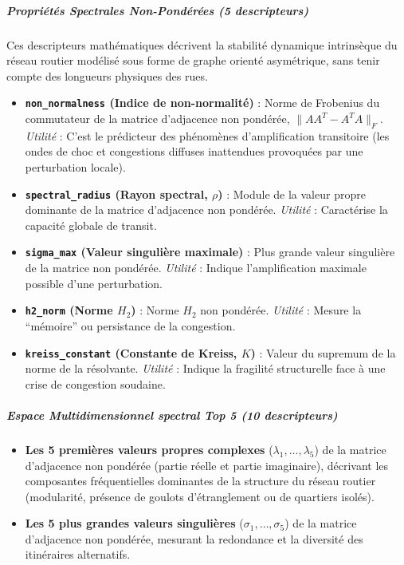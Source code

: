 \documentclass[10pt, a4paper]{article}
\providecommand{\tightlist}{}
\begin{document}
\subparagraph{Propriétés Spectrales Non-Pondérées (5
descripteurs)}\label{propriuxe9tuxe9s-spectrales-non-ponduxe9ruxe9es-5-descripteurs}

Ces descripteurs mathématiques décrivent la stabilité dynamique
intrinsèque du réseau routier modélisé sous forme de graphe orienté
asymétrique, sans tenir compte des longueurs physiques des rues.

\begin{itemize}
\tightlist
\item
  \textbf{\texttt{non\_normalness} (Indice de non-normalité)} : Norme de
  Frobenius du commutateur de la matrice d'adjacence non pondérée,
  \(\|AA^T - A^TA\|_F\). \emph{Utilité} : C'est le prédicteur des
  phénomènes d'amplification transitoire (les ondes de choc et
  congestions diffuses inattendues provoquées par une perturbation
  locale).
\item
  \textbf{\texttt{spectral\_radius} (Rayon spectral, \(\rho\))} : Module
  de la valeur propre dominante de la matrice d'adjacence non pondérée.
  \emph{Utilité} : Caractérise la capacité globale de transit.
\item
  \textbf{\texttt{sigma\_max} (Valeur singulière maximale)} : Plus
  grande valeur singulière de la matrice non pondérée. \emph{Utilité} :
  Indique l'amplification maximale possible d'une perturbation.
\item
  \textbf{\texttt{h2\_norm} (Norme \(H_2\))} : Norme \(H_2\) non
  pondérée. \emph{Utilité} : Mesure la ``mémoire'' ou persistance de la
  congestion.
\item
  \textbf{\texttt{kreiss\_constant} (Constante de Kreiss, \(K\))} :
  Valeur du supremum de la norme de la résolvante. \emph{Utilité} :
  Indique la fragilité structurelle face à une crise de congestion
  soudaine.
\end{itemize}

\subparagraph{Espace Multidimensionnel spectral Top 5 (10
descripteurs)}\label{espace-multidimensionnel-spectral-top-5-10-descripteurs}

\begin{itemize}
\tightlist
\item
  \textbf{Les 5 premières valeurs propres complexes}
  (\(\lambda_1, \dots, \lambda_5\)) de la matrice d'adjacence non
  pondérée (partie réelle et partie imaginaire), décrivant les
  composantes fréquentielles dominantes de la structure du réseau
  routier (modularité, présence de goulots d'étranglement ou de
  quartiers isolés).
\item
  \textbf{Les 5 plus grandes valeurs singulières}
  (\(\sigma_1, \dots, \sigma_5\)) de la matrice d'adjacence non
  pondérée, mesurant la redondance et la diversité des itinéraires
  alternatifs.
\end{itemize}
\end{document}
